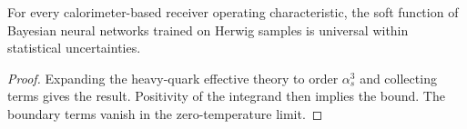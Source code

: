 \begin{proposition}[Universality]\label{thm:1}
For every calorimeter-based receiver operating characteristic, the soft
function of Bayesian neural networks trained on Herwig samples is
universal within statistical uncertainties.
\end{proposition}

\begin{proof}
Expanding the heavy-quark effective theory to order $\alpha_s^3$ and
collecting terms gives the result. Positivity of the integrand then
implies the bound. The boundary terms vanish in the zero-temperature
limit.
\end{proof}

